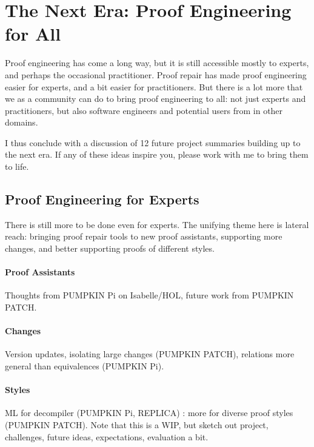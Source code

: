 \section*{The Next Era: Proof Engineering for All}


Proof engineering has come a long way, but it is still accessible mostly to experts, and perhaps the occasional practitioner.
Proof repair has made proof engineering easier for experts, and a bit easier for practitioners.
But there is a lot more that we as a community can do to bring proof engineering to all: not just experts and practitioners,
but also software engineers and potential users from in other domains.

I thus conclude with a discussion of 12 future project summaries building up to the next era.
If any of these ideas inspire you, please work with me to bring them to life.

\subsection*{Proof Engineering for Experts}

There is still more to be done even for experts.
The unifying theme here is lateral reach:
bringing proof repair tools to new proof assistants,
supporting more changes,
and better supporting proofs of different styles.

\paragraph{Proof Assistants} Thoughts from PUMPKIN Pi on Isabelle/HOL, future work from PUMPKIN PATCH.

\paragraph{Changes} Version updates, isolating large changes (PUMPKIN PATCH), relations more general than equivalences (PUMPKIN Pi).

\paragraph{Styles} ML for decompiler (PUMPKIN Pi, REPLICA) : more for diverse proof styles (PUMPKIN PATCH). Note that this is a WIP, but sketch out project, challenges, future ideas, expectations, evaluation a bit.

